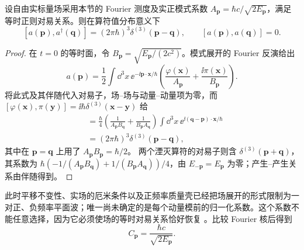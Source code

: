 \begin{proposition}
设自由实标量场采用本节的 Fourier 测度及实正模式系数 $A_{\mathbf p}=\hbar c/\sqrt{2E_{\mathbf p}}$，满足等时正则对易关系。则在算符值分布意义下
\[
[a(\mathbf p),a^\dagger(\mathbf q)]=(2\pi\hbar)^3\delta^{(3)}(\mathbf p-\mathbf q),
\qquad [a(\mathbf p),a(\mathbf q)]=0.
\]
\end{proposition}
\begin{proof}
在 $t=0$ 的等时面，令 $B_{\mathbf p}=\sqrt{E_{\mathbf p}/(2c^2)}$。模式展开的 Fourier 反演给出
\[
a(\mathbf p)=\frac12\int\dd^3x\,\ee^{-\ii\mathbf p\cdot\mathbf x/\hbar}
\left(\frac{\varphi(\mathbf x)}{A_{\mathbf p}}+\frac{\ii\pi(\mathbf x)}{B_{\mathbf p}}\right).
\]
将此式及其伴随代入对易子，场--场与动量--动量项为零，而 $[\varphi(\mathbf x),\pi(\mathbf y)]=\ii\hbar\delta^{(3)}(\mathbf x-\mathbf y)$ 给
\begin{align*}
[a(\mathbf p),a^\dagger(\mathbf q)]
&=\frac\hbar4\left(\frac1{A_{\mathbf p}B_{\mathbf q}}+
\frac1{B_{\mathbf p}A_{\mathbf q}}\right)
\int\dd^3x\,\ee^{\ii(\mathbf q-\mathbf p)\cdot\mathbf x/\hbar}\\
&=(2\pi\hbar)^3\delta^{(3)}(\mathbf p-\mathbf q),
\end{align*}
其中在 $\mathbf p=\mathbf q$ 上用了 $A_{\mathbf p}B_{\mathbf p}=\hbar/2$。
两个湮灭算符的对易子则含 $\delta^{(3)}(\mathbf p+\mathbf q)$，其系数为
$\hbar(-1/(A_{\mathbf p}B_{\mathbf q})+1/(B_{\mathbf p}A_{\mathbf q}))/4$，由 $E_{-\mathbf p}=E_{\mathbf p}$ 为零；产生--产生关系由伴随得到。
\end{proof}

此时平移不变性、实场的厄米条件以及正频率质量壳已经把场展开的形式限制为一对正、负频率平面波；唯一尚未确定的是每个动量模前的归一化系数。这个系数不能任意选择，因为它必须使场的等时对易关系恰好恢复 。比较 Fourier 核后得到
\begin{equation}
 C_{\mathbf p}=\frac{\hbar c}{\sqrt{2E_{\mathbf p}}}.
 \label{eq:scalar-C-normalization-r16}
\end{equation}

